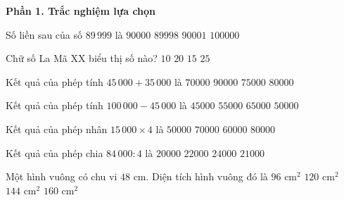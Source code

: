 \textbf{Phần 1. Trắc nghiệm lựa chọn}

\begin{ex} %
Số liền sau của số $89\,999$ là
\choice
{\True $90000$}
{$89998$}
{$90001$}
{$100000$}
\end{ex}

\begin{ex} %
Chữ số La Mã $\text{XX}$ biểu thị số nào?
\choice
{$10$}
{\True $20$}
{$15$}
{$25$}
\end{ex}

\begin{ex} %
Kết quả của phép tính $45\,000 + 35\,000$ là
\choice
{$70000$}
{$90000$}
{$75000$}
{\True $80000$}
\end{ex}

\begin{ex} %
Kết quả của phép tính $100\,000 - 45\,000$ là
\choice
{$45000$}
{\True $55000$}
{$65000$}
{$50000$}
\end{ex}

\begin{ex} %
Kết quả của phép nhân $15\,000 \times 4$ là
\choice
{$50000$}
{$70000$}
{\True $60000$}
{$80000$}
\end{ex}

\begin{ex} %
Kết quả của phép chia $84\,000 : 4$ là
\choice
{$20000$}
{$22000$}
{$24000$}
{\True $21000$}
\end{ex}

\begin{ex} %
Một hình vuông có chu vi $48\text{ cm}$. Diện tích hình vuông đó là
\choice
{$96\text{ cm}^2$}
{$120\text{ cm}^2$}
{\True $144\text{ cm}^2$}
{$160\text{ cm}^2$}
\end{ex}

